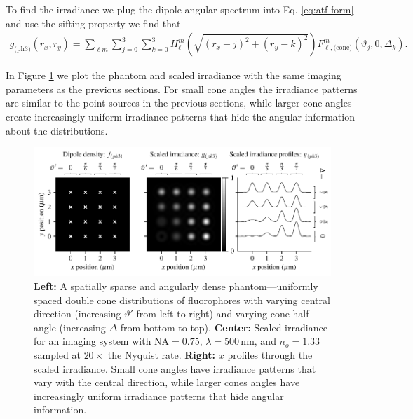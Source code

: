 \documentclass[]{osa-article}
\begin{document}
 To find the irradiance we plug the dipole angular spectrum into Eq.
 \ref{eq:atf-form} and use the sifting property we find that
 \begin{align}
   g_{\text{(ph3)}}(r_x, r_y) = \sum_{\ell m}\sum_{j=0}^3 \sum_{k=0}^3 H_\ell^m\left(\sqrt{\left(r_x - j\right)^2 + \left(r_y - k\right)^2}\right) F^m_{\ell,\text{(cone)}}\left(\vartheta_j, 0, \Delta_k\right).\label{eq:phantom3irr}
 \end{align}

 In Figure \ref{fig:ph3} we plot the phantom and scaled irradiance with the same
 imaging parameters as the previous sections. For small cone angles the
 irradiance patterns are similar to the point sources in the previous sections,
 while larger cone angles create increasingly uniform irradiance patterns that
 hide the angular information about the distributions.

  \begin{figure}[h]
 \centering
   \centering
   \includegraphics[scale=0.8]{../figures/paratfs/ph3.pdf}
   \caption{\textbf{Left:} A spatially sparse and angularly dense
     phantom---uniformly spaced double cone distributions of fluorophores with
     varying central direction (increasing $\vartheta'$ from left to right) and
     varying cone half-angle (increasing $\Delta$ from bottom to top).
     \textbf{Center:} Scaled irradiance for an imaging system with
     $\text{NA} = 0.75$, $\lambda = 500\,\text{nm}$, and $n_o = 1.33$ sampled at
     $20\times$ the Nyquist rate. \textbf{Right:} $x$ profiles through the
     scaled irradiance. Small cone angles have irradiance patterns that vary
     with the central direction, while larger cones angles have increasingly
     uniform irradiance patterns that hide angular information.}
   \label{fig:ph3}
 \end{figure}
\end{document}
